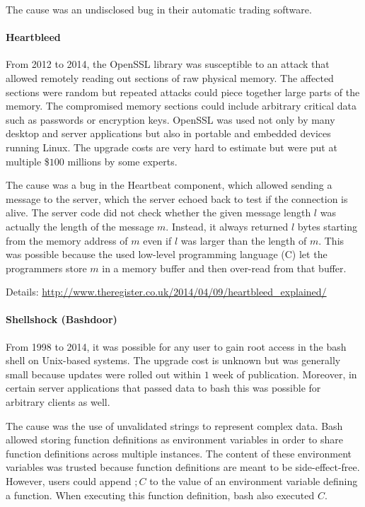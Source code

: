 The cause was an undisclosed bug in their automatic trading software.

\paragraph{Heartbleed}
From 2012 to 2014, the OpenSSL library was susceptible to an attack that allowed remotely reading out sections of raw physical memory.
The affected sections were random but repeated attacks could piece together large parts of the memory.
The compromised memory sections could include arbitrary critical data such as passwords or encryption keys.
OpenSSL was used not only by many desktop and server applications but also in portable and embedded devices running Linux.
The upgrade costs are very hard to estimate but were put at multiple \$$100$ millions by some experts.

The cause was a bug in the Heartbeat component, which allowed sending a message to the server, which the server echoed back to test if the connection is alive.
The server code did not check whether the given message length $l$ was actually the length of the message $m$.
Instead, it always returned $l$ bytes starting from the memory address of $m$ even if $l$ was larger than the length of $m$.
This was possible because the used low-level programming language (C) let the programmers store $m$ in a memory buffer and then over-read from that buffer.

Details: \url{http://www.theregister.co.uk/2014/04/09/heartbleed_explained/}

\paragraph{Shellshock (Bashdoor)}
From 1998 to 2014, it was possible for any user to gain root access in the bash shell on Unix-based systems.
The upgrade cost is unknown but was generally small because updates were rolled out within $1$ week of publication.
Moreover, in certain server applications that passed data to bash this was possible for arbitrary clients as well.

The cause was the use of unvalidated strings to represent complex data.
Bash allowed storing function definitions as environment variables in order to share function definitions across multiple instances.
The content of these environment variables was trusted because function definitions are meant to be side-effect-free.
However, users could append $; C$ to the value of an environment variable defining a function.
When executing this function definition, bash also executed $C$.

